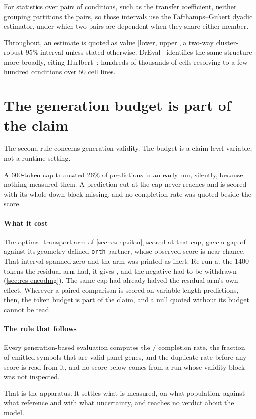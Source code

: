 For statistics over pairs of conditions, such as the transfer coefficient,
neither grouping partitions the pairs, so those intervals use the
Fafchamps--Gubert dyadic estimator, under which two pairs are dependent when
they share either member.

Throughout, an estimate is quoted as value [lower, upper], a two-way
cluster-robust $95\%$ interval unless stated otherwise. DrEval~\cite{dreval}
identifies the same structure more broadly, citing Hurlbert~\cite{hurlbert}:
hundreds of thousands of cells resolving to a few hundred conditions over $50$
cell lines.

\section{The generation budget is part of the claim}

The second rule concerns generation validity. The budget is a claim-level
variable, not a runtime setting.

A $600$-token cap truncated $26\%$ of predictions in an early run, silently,
because nothing measured them. A prediction cut at the cap never reaches \DOWN{}
and is scored with its whole down-block missing, and no completion rate was
quoted beside the score.

\paragraph{What it cost} The optimal-transport arm of
\cref{sec:res-epsilon}, scored at that cap, gave a gap of
 against its geometry-defined \texttt{orth}
partner, whose observed score is near chance. That interval spanned zero and the
arm was printed as inert. Re-run at the $1400$
tokens the residual arm had, it gives , and the
negative had to be withdrawn (\cref{sec:res-encoding}). The same cap had already
halved the residual arm's own effect. Wherever a paired comparison is scored on
variable-length predictions, then, the token budget is part of the claim, and a
null quoted without its budget cannot be read.

\paragraph{The rule that follows} Every generation-based evaluation computes the
\ENDCELL{}/\DOWN{} completion rate, the fraction of emitted symbols that are
valid panel genes, and the duplicate rate before any score is read from it, and
no score below comes from a run whose validity block was not inspected.

That is the apparatus. It settles what is measured, on what population, against
what reference and with what uncertainty, and reaches no verdict about the
model.
